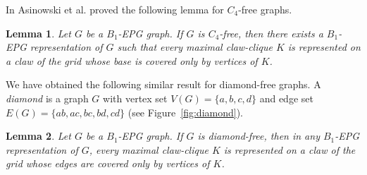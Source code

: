 \documentclass[9pt]{entcs}
\newtheorem{lema}{Lemma}[section]
\begin{document}


In \cite{ries2009} Asinowski et al. proved the following lemma for $C_4$-free graphs.

\begin{lema} \cite{ries2009} \label{lem:lemaBRies2009}
Let $G$ be a $B_1$-EPG graph. If $G$ is $C_4$-free, then there exists a $B_1$-EPG representation of $G$ such that every  maximal claw-clique $K$ is represented on a claw of the grid whose base is covered only by vertices of $K$.
\end{lema}


We have obtained the following similar result for diamond-free graphs. A \textit{diamond} is a graph $G$ with vertex set $V(G) = \{a, b, c, d\}$ and edge set $E(G)=\{ab, ac,bc, bd,cd\}$ (see Figure~\ref{fig:diamond}). %



\begin{lema}\label{lem:b1epgDiamondFree}
Let $G$ be a $B_1$-EPG graph. If $G$ is diamond-free, then in any $B_1$-EPG representation of $G$,  every maximal claw-clique $K$ is represented on a claw of the grid whose edges are covered only by vertices of $K$.%

\end{lema}
\end{document}
